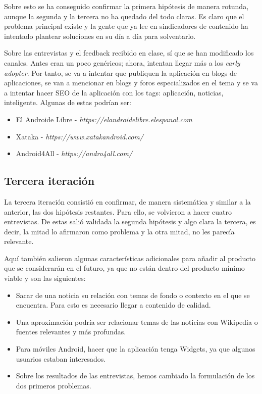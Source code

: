 Sobre esto se ha conseguido confirmar la primera hipótesis de manera rotunda, aunque la segunda y la tercera no ha quedado del todo claras. Es claro que el problema principal existe y la gente que ya lee en sindicadores de contenido ha intentado plantear soluciones en su día a día para solventarlo.

Sobre las entrevistas y el feedback recibido en clase, sí que se han modificado los canales. Antes eran un poco genéricos; ahora, intentan llegar más a los \textit{early adopter}. Por tanto, se va a intentar que publiquen la aplicación en blogs de aplicaciones, se van a mencionar en blogs y foros especializados en el tema y se va a intentar hacer SEO de la aplicación con los tags: aplicación, noticias, inteligente. Algunas de estas podrían ser:

\begin{itemize}
    \item El Androide Libre - \textsl{https://elandroidelibre.elespanol.com}
    \item Xataka - \textsl{https://www.xatakandroid.com/}
    \item Android4All - \textsl{https://andro4all.com/}
\end{itemize}


\subsection{Tercera iteración}

La tercera iteración consistió en confirmar, de manera sistemática y similar a la anterior, las dos hipótesis restantes. Para ello, se volvieron a hacer cuatro entrevistas. De estas salió validada la segunda hipótesis y algo clara la tercera, es decir, la mitad lo afirmaron como problema y la otra mitad, no les parecía relevante.

Aquí también salieron algunas características adicionales para añadir al producto que se considerarán en el futuro, ya que no están dentro del producto mínimo viable y son las siguientes:

\begin{itemize}
    \item Sacar de una noticia su relación con temas de fondo o contexto en el que se encuentra. Para esto es necesario llegar a contenido de calidad.
    \item Una aproximación podría ser relacionar temas de las noticias con Wikipedia o fuentes relevantes y más profundas.
    \item Para móviles Android, hacer que la aplicación tenga Widgets, ya que algunos usuarios estaban interesados.
    \item Sobre los resultados de las entrevistas, hemos cambiado la formulación de los dos primeros problemas.
\end{itemize}

